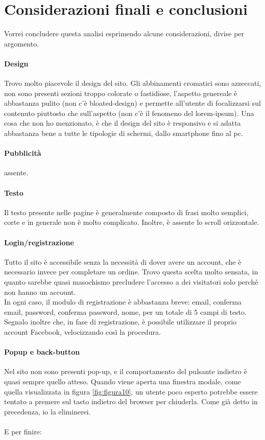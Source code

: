 \section{Considerazioni finali e conclusioni}
Vorrei concludere questa analisi esprimendo alcune considerazioni, divise per argomento.
\paragraph{Design} Trovo molto piacevole il design del sito. Gli abbinamenti cromatici sono azzeccati, non sono presenti sezioni troppo colorate o fastidiose, l'aspetto genereale è abbastanza pulito (non c'è bloated-design) e permette all'utente di focalizzarsi sul contenuto piuttosto che sull'aspetto (non c'è il fenomeno del lorem-ipsum). Una cosa che non ho menzionato, è che il design del sito è responsivo e si adatta abbastanza bene a tutte le tipologie di schermi, dallo smartphone fino al pc.
\paragraph{Pubblicità} assente.
\paragraph{Testo} Il testo presente nelle pagine è generalmente composto di frasi molto semplici, corte e in generale non è molto complicato. Inoltre, è assente lo scroll orizzontale.
\paragraph{Login/registrazione} Tutto il sito è accessibile senza la necessità di dover avere un account, che è necessario invece per completare un ordine. Trovo questa scelta molto sensata, in quanto sarebbe quasi masochismo precludere l'accesso a dei visitatori solo perché non hanno un account.\\In ogni caso, il modulo di registrazione è abbastanza breve: email, conferma email, password, conferma password, nome, per un totale di 5 campi di testo. Segnalo inoltre che, in fase di registrazione, è possibile utilizzare il proprio account Facebook, velocizzando così la procedura. 
\paragraph{Popup e back-button} Nel sito non sono presenti pop-up, e il comportamento del pulsante indietro è quasi sempre quello atteso. Quando viene aperta una finestra modale, come quella visualizzata in figura \ref{fig:figura10}, un utente poco esperto potrebbe essere tentato a premere sul tasto indietro del browser per chiuderla. Come già detto in precedenza, io la eliminerei.\\
\\ E per finire:
